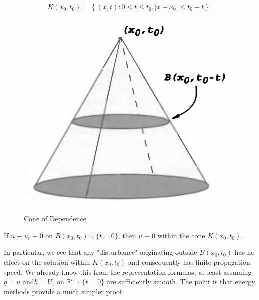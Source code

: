 $$
K\left( x_0,t_0 \right) =\left\{ \left( x,t \right) :0\le t\le t_0,\left| x-x_0 \right|\le t_0-t \right\} .
$$
\begin{figure}[htbp]
    \center
    \includegraphics[scale=0.29]{Image/Cone of Dependence.png}
    \caption{Cone of Dependence}
\end{figure}
\begin{theorem}
If $u\equiv u_t\equiv 0$ on $B(x_0,t_0)\times\{t=0\}$, then $u\equiv 0$ within the cone $K(x_0,t_0)$.
\end{theorem}
In particular, we see that any "disturbance" originating outside $B(x_0, t_0)$ has no effect on the solution within $K(x_0, t_0)$ and consequently has finite propagation speed. We already know this from the representation formulas, at least assuming $g=u$ and$ h=U_t$ on $\mathbb{R}^n\times\{t=0\}$ are sufficiently smooth. The point is that energy methods provide a much simpler proof.
